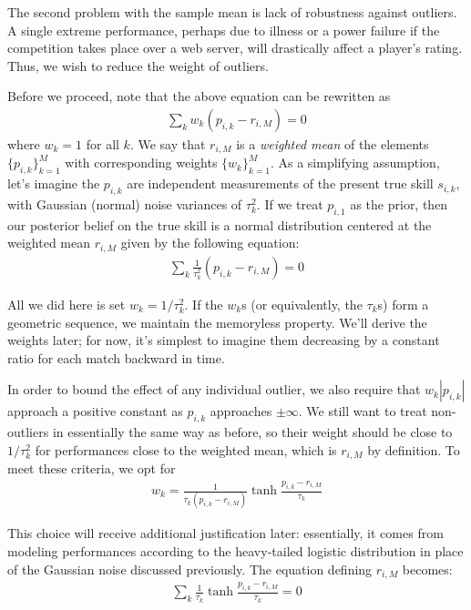 \documentclass{article}
\begin{document}
The second problem with the sample mean is lack of robustness against outliers. A single extreme performance, perhaps due to illness or a power failure if the competition takes place over a web server, will drastically affect a player's rating. Thus, we wish to reduce the weight of outliers.

Before we proceed, note that the above equation can be rewritten as
\begin{align}
\sum_k w_k(p_{i,k} - r_{i,M}) = 0
\end{align}
where $w_k = 1$ for all $k$. We say that $r_{i,M}$ is a \emph{weighted mean} of the elements $\{p_{i,k}\}_{k=1}^{M}$ with corresponding weights $\{w_k\}_{k=1}^M$. As a simplifying assumption, let's imagine the $p_{i,k}$ are independent measurements of the present true skill $s_{i,k}$, with Gaussian (normal) noise variances of $\tau_k^2$. If we treat $p_{i,1}$ as the prior, then our posterior belief on the true skill is a normal distribution centered at the weighted mean $r_{i,M}$ given by the following equation:
\begin{align}
\sum_k \frac{1}{\tau_k^2} (p_{i,k} - r_{i,M}) = 0
\end{align}

All we did here is set $w_k = 1/\tau_k^2$. If the $w_k$s (or equivalently, the $\tau_k$s) form a geometric sequence, we maintain the memoryless property. We'll derive the weights later; for now, it's simplest to imagine them decreasing by a constant ratio for each match backward in time.

In order to bound the effect of any individual outlier, we also require that $w_k|p_{i,k}|$ approach a positive constant as $p_{i,k}$ approaches $\pm\infty$. We still want to treat non-outliers in essentially the same way as before, so their weight should be close to $1/\tau_k^2$ for performances close to the weighted mean, which is $r_{i,M}$ by definition. To meet these criteria, we opt for
\begin{align}
w_k = \frac{1}{\tau_k(p_{i,k} - r_{i,M})} \tanh\frac{p_{i,k} - r_{i,M}}{\tau_k}
\end{align}

This choice will receive additional justification later: essentially, it comes from modeling performances according to the heavy-tailed logistic distribution in place of the Gaussian noise discussed previously. The equation defining $r_{i,M}$ becomes:
\begin{align}
\sum_k \frac {1}{\tau_k} \tanh\frac{p_{i,k} - r_{i,M}}{\tau_k} = 0
\end{align}
\end{document}
